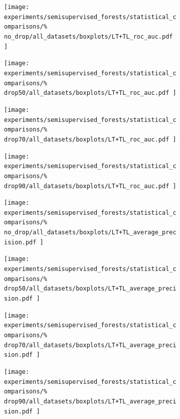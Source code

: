 
\begin{figure}[tb]
    \centering
    \begin{subfigure}{0.24\textwidth}
        \texttt{[image: 
            experiments/semisupervised\_forests/statistical\_comparisons/\%
            no\_drop/all\_datasets/boxplots/LT+TL\_roc\_auc.pdf
        ]}
    \end{subfigure}
    \begin{subfigure}{0.24\textwidth}
        \texttt{[image: 
            experiments/semisupervised\_forests/statistical\_comparisons/\%
            drop50/all\_datasets/boxplots/LT+TL\_roc\_auc.pdf
        ]}
    \end{subfigure}
    \begin{subfigure}{0.24\textwidth}
        \texttt{[image: 
            experiments/semisupervised\_forests/statistical\_comparisons/\%
            drop70/all\_datasets/boxplots/LT+TL\_roc\_auc.pdf
        ]}
    \end{subfigure}
    \begin{subfigure}{0.24\textwidth}
        \texttt{[image: 
            experiments/semisupervised\_forests/statistical\_comparisons/\%
            drop90/all\_datasets/boxplots/LT+TL\_roc\_auc.pdf
        ]}
    \end{subfigure}

    \begin{subfigure}{0.24\textwidth}
        \texttt{[image: 
            experiments/semisupervised\_forests/statistical\_comparisons/\%
            no\_drop/all\_datasets/boxplots/LT+TL\_average\_precision.pdf
        ]}
    \end{subfigure}
    \begin{subfigure}{0.24\textwidth}
        \texttt{[image: 
            experiments/semisupervised\_forests/statistical\_comparisons/\%
            drop50/all\_datasets/boxplots/LT+TL\_average\_precision.pdf
        ]}
    \end{subfigure}
    \begin{subfigure}{0.24\textwidth}
        \texttt{[image: 
            experiments/semisupervised\_forests/statistical\_comparisons/\%
            drop70/all\_datasets/boxplots/LT+TL\_average\_precision.pdf
        ]}
    \end{subfigure}
    \begin{subfigure}{0.24\textwidth}
        \texttt{[image: 
            experiments/semisupervised\_forests/statistical\_comparisons/\%
            drop90/all\_datasets/boxplots/LT+TL\_average\_precision.pdf
        ]}
    \end{subfigure}


\end{figure}
